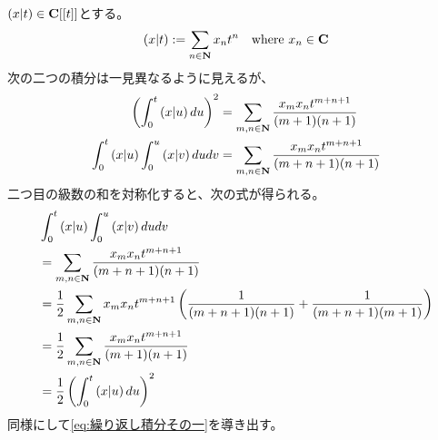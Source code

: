 {	\begin{note}[積分計算その一]\label{note:積分計算その一} %
		$\mathinner{\left({x|t}\right)}\in\mathbf{C}[[t]]$とする。
		\begin{equation*}\begin{split}
			\mathinner{\left({x|t}\right)} := \sum_{n\in\mathbf{N}} x_nt^n \quad\text{where } 
			x_n\in\mathbf{C}
		\end{split}\end{equation*}
		次の二つの積分は一見異なるように見えるが、
		\begin{equation*}\begin{split}
			\mathinner{\left({\int_0^t\mathinner{\left({x|u}\right)}du}\right)}^2 &= \sum_{m,n\in\mathbf{N}} 
				\frac{x_mx_nt^{m+n+1}}{(m+1)(n+1)} \\
			\int_0^t\mathinner{\left({x|u}\right)}\int_0^u\mathinner{\left({x|v}\right)}dudv &= \sum_{m,n\in\mathbf{N}} 
				\frac{x_mx_nt^{m+n+1}}{(m+n+1)(n+1)} \\
		\end{split}\end{equation*}
		二つ目の級数の和を対称化すると、次の式が得られる。
		\begin{equation*}\begin{split}
			&\int_0^t\mathinner{\left({x|u}\right)}\int_0^u\mathinner{\left({x|v}\right)}dudv \\
			&= \sum_{m,n\in\mathbf{N}} \frac{x_mx_nt^{m+n+1}}{(m+n+1)(n+1)} \\
			&= \frac{1}{2}\sum_{m,n\in\mathbf{N}} x_mx_nt^{m+n+1}
				\mathinner{\left({\frac{1}{(m+n+1)(n+1)} + \frac{1}{(m+n+1)(m+1)}}\right)} \\
			&= \frac{1}{2}\sum_{m,n\in\mathbf{N}} 
				\frac{x_mx_nt^{m+n+1}}{(m+1)(n+1)} \\
			&= \frac{1}{2}\mathinner{\left({\int_0^t\mathinner{\left({x|u}\right)}du}\right)}^2
		\end{split}\end{equation*}
		同様にして\eqref{eq:繰り返し積分その一}を導き出す。
	\end{note} %
}
